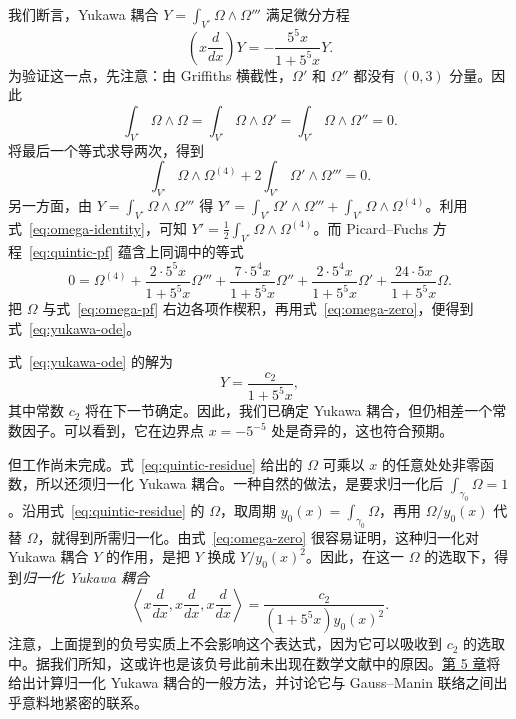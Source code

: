 我们断言，Yukawa 耦合 $Y=\int_{V^\circ}\Omega\wedge\Omega'''$ 满足微分方程
\begin{equation}\label{eq:yukawa-ode}
\left(x\frac d{dx}\right)Y=-\frac{5^5x}{1+5^5x}Y.
\end{equation}
为验证这一点，先注意：由 Griffiths 横截性，$\Omega'$ 和 $\Omega''$ 都没有 $(0,3)$ 分量。因此
\begin{equation}\label{eq:omega-zero}
\int_{V^\circ}\Omega\wedge\Omega
=\int_{V^\circ}\Omega\wedge\Omega'
=\int_{V^\circ}\Omega\wedge\Omega''=0.
\end{equation}
将最后一个等式求导两次，得到
\begin{equation}\label{eq:omega-identity}
\int_{V^\circ}\Omega\wedge\Omega^{(4)}
+2\int_{V^\circ}\Omega'\wedge\Omega'''=0.
\end{equation}
另一方面，由 $Y=\int_{V^\circ}\Omega\wedge\Omega'''$ 得
$Y'=\int_{V^\circ}\Omega'\wedge\Omega'''+\int_{V^\circ}\Omega\wedge\Omega^{(4)}$。利用式~\eqref{eq:omega-identity}，可知 $Y'=\frac12\int_{V^\circ}\Omega\wedge\Omega^{(4)}$。而 Picard--Fuchs 方程~\eqref{eq:quintic-pf} 蕴含上同调中的等式
\begin{equation}\label{eq:omega-pf}
0=\Omega^{(4)}+\frac{2\cdot5^5x}{1+5^5x}\Omega'''
+\frac{7\cdot5^4x}{1+5^5x}\Omega''
+\frac{2\cdot5^4x}{1+5^5x}\Omega'
+\frac{24\cdot5x}{1+5^5x}\Omega.
\end{equation}
把 $\Omega$ 与式~\eqref{eq:omega-pf} 右边各项作楔积，再用式~\eqref{eq:omega-zero}，便得到式~\eqref{eq:yukawa-ode}。

式~\eqref{eq:yukawa-ode} 的解为
\begin{equation}\label{eq:yukawa-unnormalized}
Y=\frac{c_2}{1+5^5x},
\end{equation}
其中常数 $c_2$ 将在下一节确定。因此，我们已确定 Yukawa 耦合，但仍相差一个常数因子。可以看到，它在边界点 $x=-5^{-5}$ 处是奇异的，这也符合预期。

但工作尚未完成。式~\eqref{eq:quintic-residue} 给出的 $\Omega$ 可乘以 $x$ 的任意处处非零函数，所以还须归一化 Yukawa 耦合。一种自然的做法，是要求归一化后 $\int_{\gamma_0}\Omega=1$。沿用式~\eqref{eq:quintic-residue} 的 $\Omega$，取周期 $y_0(x)=\int_{\gamma_0}\Omega$，再用 $\Omega/y_0(x)$ 代替 $\Omega$，就得到所需归一化。由式~\eqref{eq:omega-zero} 很容易证明，这种归一化对 Yukawa 耦合
$Y$ 的作用，是把 $Y$ 换成 $Y/y_0(x)^2$。因此，在这一 $\Omega$ 的选取下，得到\emph{归一化 Yukawa 耦合}
\begin{equation}\label{eq:yukawa-normalized}
\left\langle x\frac d{dx},x\frac d{dx},x\frac d{dx}\right\rangle
=\frac{c_2}{(1+5^5x)y_0(x)^2}.
\end{equation}
注意，上面提到的负号实质上不会影响这个表达式，因为它可以吸收到 $c_2$ 的选取中。据我们所知，这或许也是该负号此前未出现在数学文献中的原因。\hyperref[chap:hodge-yukawa]{第 5 章}将给出计算归一化 Yukawa 耦合的一般方法，并讨论它与 Gauss--Manin 联络之间出乎意料地紧密的联系。


